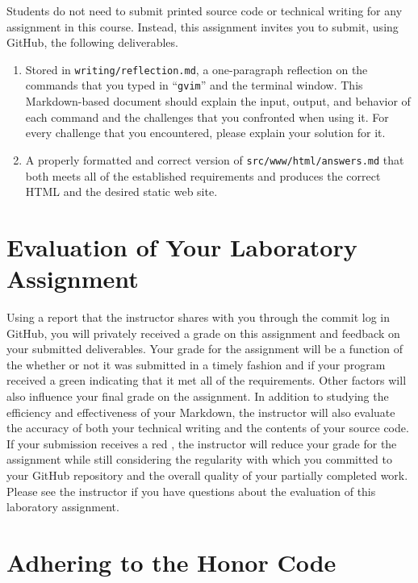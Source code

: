 \documentclass[11pt]{article}
\newcommand{\mainprogramsource}{\lstinline{src/www/html/answers.md}}
\newcommand{\reflection}{\lstinline{writing/reflection.md}}
\newcommand{\command}[1]{``\lstinline{#1}''}
\newcommand{\checkmark}{\ding{51}}
\newcommand{\naughtmark}{\ding{55}}
\begin{document}
\noindent Students do not need to submit printed source code or technical writing for any assignment in this course.
Instead, this assignment invites you to submit, using GitHub, the following deliverables.

\begin{enumerate}

\setlength{\itemsep}{0in}

\item Stored in \reflection{}, a one-paragraph reflection on the commands that you typed in \command{gvim} and the
  terminal window. This Markdown-based document should explain the input, output, and behavior of each command and the
  challenges that you confronted when using it. For every challenge that you encountered, please explain your solution
  for it.

\item A properly formatted and correct version of \mainprogramsource{} that both meets all of the established
  requirements and produces the correct HTML and the desired static web site.

\end{enumerate}

\section*{Evaluation of Your Laboratory Assignment}

Using a report that the instructor shares with you through the commit log in GitHub, you will privately received a grade
on this assignment and feedback on your submitted deliverables. Your grade for the assignment will be a function of the
whether or not it was submitted in a timely fashion and if your program received a green \checkmark{} indicating that it
met all of the requirements. Other factors will also influence your final grade on the assignment. In addition to
studying the efficiency and effectiveness of your Markdown, the instructor will also evaluate the accuracy of both your
technical writing and the contents of your source code. If your submission receives a red \naughtmark{}, the instructor
will reduce your grade for the assignment while still considering the regularity with which you committed to your GitHub
repository and the overall quality of your partially completed work. Please see the instructor if you have questions
about the evaluation of this laboratory assignment.

\section*{Adhering to the Honor Code}
\end{document}
